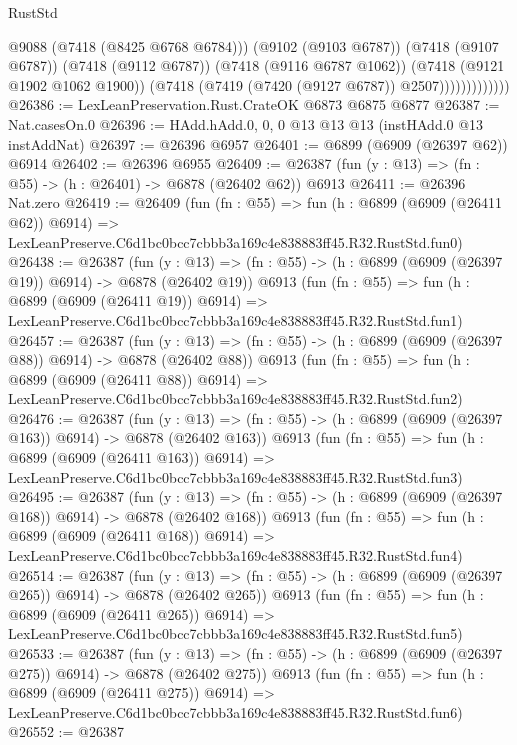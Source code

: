 \begin{lexlean}{RustStd}
\begin{coremodule}
                            @9088
                            (@7418 (@8425 @6768 @6784)))
                          (@9102 (@9103 @6787))
                          (@7418 (@9107 @6787))
                          (@7418 (@9112 @6787))
                          (@7418 (@9116 @6787 @1062))
                          (@7418 (@9121 @1902 @1062 @1900))
                          (@7418 (@7419 (@7420 (@9127 @6787)) @2507)))))))))))))
@26386 := LexLeanPreservation.Rust.CrateOK @6873 @6875 @6877
@26387 := Nat.casesOn.{0}
@26396 := HAdd.hAdd.{0, 0, 0} @13 @13 @13 (instHAdd.{0} @13 instAddNat)
@26397 := @26396 @6957
@26401 := @6899 (@6909 (@26397 @62)) @6914
@26402 := @26396 @6955
@26409 := @26387 (fun (y : @13) => (fn : @55) -> (h : @26401) -> @6878 (@26402 @62)) @6913
@26411 := @26396 Nat.zero
@26419 := @26409
    (fun (fn : @55) =>
    fun (h : @6899 (@6909 (@26411 @62)) @6914) =>
    LexLeanPreserve.C6d1bc0bcc7cbbb3a169c4e838883ff45.R32.RustStd.fun0)
@26438 := @26387
    (fun (y : @13) => (fn : @55) -> (h : @6899 (@6909 (@26397 @19)) @6914) -> @6878 (@26402 @19))
    @6913
    (fun (fn : @55) =>
    fun (h : @6899 (@6909 (@26411 @19)) @6914) =>
    LexLeanPreserve.C6d1bc0bcc7cbbb3a169c4e838883ff45.R32.RustStd.fun1)
@26457 := @26387
    (fun (y : @13) => (fn : @55) -> (h : @6899 (@6909 (@26397 @88)) @6914) -> @6878 (@26402 @88))
    @6913
    (fun (fn : @55) =>
    fun (h : @6899 (@6909 (@26411 @88)) @6914) =>
    LexLeanPreserve.C6d1bc0bcc7cbbb3a169c4e838883ff45.R32.RustStd.fun2)
@26476 := @26387
    (fun (y : @13) => (fn : @55) -> (h : @6899 (@6909 (@26397 @163)) @6914) -> @6878 (@26402 @163))
    @6913
    (fun (fn : @55) =>
    fun (h : @6899 (@6909 (@26411 @163)) @6914) =>
    LexLeanPreserve.C6d1bc0bcc7cbbb3a169c4e838883ff45.R32.RustStd.fun3)
@26495 := @26387
    (fun (y : @13) => (fn : @55) -> (h : @6899 (@6909 (@26397 @168)) @6914) -> @6878 (@26402 @168))
    @6913
    (fun (fn : @55) =>
    fun (h : @6899 (@6909 (@26411 @168)) @6914) =>
    LexLeanPreserve.C6d1bc0bcc7cbbb3a169c4e838883ff45.R32.RustStd.fun4)
@26514 := @26387
    (fun (y : @13) => (fn : @55) -> (h : @6899 (@6909 (@26397 @265)) @6914) -> @6878 (@26402 @265))
    @6913
    (fun (fn : @55) =>
    fun (h : @6899 (@6909 (@26411 @265)) @6914) =>
    LexLeanPreserve.C6d1bc0bcc7cbbb3a169c4e838883ff45.R32.RustStd.fun5)
@26533 := @26387
    (fun (y : @13) => (fn : @55) -> (h : @6899 (@6909 (@26397 @275)) @6914) -> @6878 (@26402 @275))
    @6913
    (fun (fn : @55) =>
    fun (h : @6899 (@6909 (@26411 @275)) @6914) =>
    LexLeanPreserve.C6d1bc0bcc7cbbb3a169c4e838883ff45.R32.RustStd.fun6)
@26552 := @26387

\end{coremodule}
\end{lexlean}
